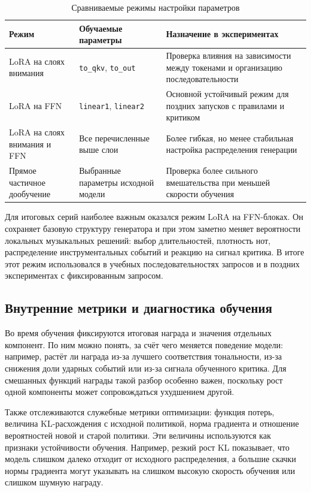 \documentclass[a4paper,12pt]{extarticle}
\begin{document}
\begin{table}[h]
\centering
\caption{Сравниваемые режимы настройки параметров}
\label{tab:adaptation-strategies}
\begin{tabular}{|p{}|p{}|p{}|}
\hline
\textbf{Режим} & \textbf{Обучаемые параметры} & \textbf{Назначение в экспериментах} \\
\hline
LoRA на слоях внимания & \texttt{to\_qkv}, \texttt{to\_out} &
Проверка влияния на зависимости между токенами и организацию последовательности \\
\hline
LoRA на FFN & \texttt{linear1}, \texttt{linear2} &
Основной устойчивый режим для поздних запусков с правилами и критиком \\
\hline
LoRA на слоях внимания и FFN & Все перечисленные выше слои &
Более гибкая, но менее стабильная настройка распределения генерации \\
\hline
Прямое частичное дообучение & Выбранные параметры исходной модели &
Проверка более сильного вмешательства при меньшей скорости обучения \\
\hline
\end{tabular}
\end{table}

Для итоговых серий наиболее важным оказался режим LoRA на FFN-блоках. Он
сохраняет базовую структуру генератора и при этом заметно меняет
вероятности локальных музыкальных решений: выбор длительностей, плотность нот,
распределение инструментальных событий и реакцию на сигнал критика. В итоге
этот режим использовался в учебных последовательностях запросов и в
поздних экспериментах с фиксированным запросом.

\subsection{Внутренние метрики и диагностика обучения}

Во время обучения фиксируются итоговая награда и значения отдельных
компонент. По ним можно понять, за счёт чего меняется поведение модели:
например, растёт ли награда из-за лучшего соответствия тональности, из-за
снижения доли ударных событий или из-за сигнала обученного критика. Для
смешанных функций награды такой разбор особенно важен, поскольку рост одной
компоненты может сопровождаться ухудшением другой.

Также отслеживаются служебные метрики оптимизации: функция потерь, величина
KL-расхождения с исходной политикой, норма градиента и отношение вероятностей
новой и старой политики. Эти величины используются как признаки устойчивости
обучения. Например, резкий рост KL показывает, что модель слишком далеко
отходит от исходного распределения, а большие скачки нормы градиента могут
указывать на слишком высокую скорость обучения или слишком шумную награду.
\end{document}
